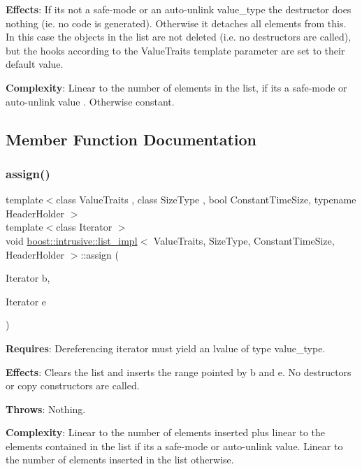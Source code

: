 {\bfseries Effects}\+: If it\textquotesingle{}s not a safe-\/mode or an auto-\/unlink value\+\_\+type the destructor does nothing (ie. no code is generated). Otherwise it detaches all elements from this. In this case the objects in the list are not deleted (i.\+e. no destructors are called), but the hooks according to the Value\+Traits template parameter are set to their default value.

{\bfseries Complexity}\+: Linear to the number of elements in the list, if it\textquotesingle{}s a safe-\/mode or auto-\/unlink value . Otherwise constant. 

\subsection{Member Function Documentation}
\mbox{\label{classboost_1_1intrusive_1_1list__impl_a9d29df1112a14488065cf678e4c1484a}} 
\subsubsection{\texorpdfstring{assign()}{assign()}}
{\footnotesize\ttfamily template$<$class Value\+Traits , class Size\+Type , bool Constant\+Time\+Size, typename Header\+Holder $>$ \\
template$<$class Iterator $>$ \\
void \hyperlink{classboost_1_1intrusive_1_1list__impl}{boost\+::intrusive\+::list\+\_\+impl}$<$ Value\+Traits, Size\+Type, Constant\+Time\+Size, Header\+Holder $>$\+::assign (\begin{DoxyParamCaption}\item[{Iterator}]{b,  }\item[{Iterator}]{e }\end{DoxyParamCaption})\hspace{0.3cm}{\ttfamily [inline]}}

{\bfseries Requires}\+: Dereferencing iterator must yield an lvalue of type value\+\_\+type.

{\bfseries Effects}\+: Clears the list and inserts the range pointed by b and e. No destructors or copy constructors are called.

{\bfseries Throws}\+: Nothing.

{\bfseries Complexity}\+: Linear to the number of elements inserted plus linear to the elements contained in the list if it\textquotesingle{}s a safe-\/mode or auto-\/unlink value. Linear to the number of elements inserted in the list otherwise.

